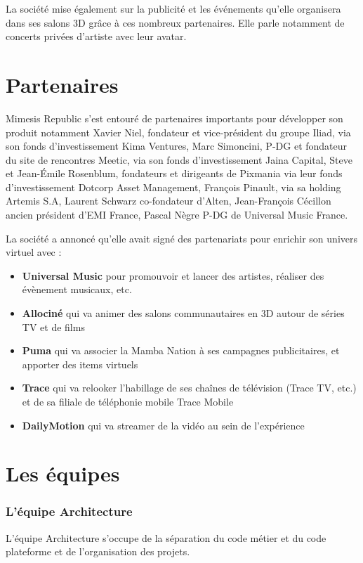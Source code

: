 La société mise également sur la publicité et les événements qu'elle organisera
dans ses salons 3D grâce à ces nombreux partenaires. Elle parle notamment de
concerts privées d'artiste avec leur avatar.

\section{Partenaires}

Mimesis Republic s'est entouré de partenaires importants pour développer son
produit notamment Xavier Niel, fondateur et vice-président du groupe Iliad, via
son fonds d’investissement Kima Ventures, Marc Simoncini, P-DG et fondateur du
site de rencontres Meetic, via son fonds d'investissement Jaina Capital, Steve
et Jean-Émile Rosenblum, fondateurs et dirigeants de Pixmania via leur fonds
d'investissement Dotcorp Asset Management, François Pinault, via sa holding
Artemis S.A, Laurent Schwarz co-fondateur d'Alten, Jean-François Cécillon ancien
président d'EMI France, Pascal Nègre P-DG de Universal Music France.

La société a annoncé qu'elle avait signé des partenariats pour enrichir son
univers virtuel avec :
\begin{itemize}
\item[\textbullet]\textbf{Universal Music} pour promouvoir et lancer des artistes,
  réaliser des évènement musicaux, etc.
\item[\textbullet]\textbf{Allociné} qui va animer des salons communautaires en
  3D autour de séries TV et de films
\item[\textbullet]\textbf{Puma} qui va associer la Mamba Nation à ses
  campagnes publicitaires, et apporter des items virtuels
\item[\textbullet]\textbf{Trace} qui va relooker l'habillage de ses chaînes de
  télévision (Trace TV, etc.) et de sa filiale de téléphonie mobile Trace
  Mobile
\item[\textbullet]\textbf{DailyMotion} qui va streamer de la vidéo au sein de
  l’expérience
\end{itemize}


\section{Les équipes}

\subsubsection{L'équipe Architecture}
L'équipe Architecture s'occupe de la séparation du code métier et du code
plateforme et de l'organisation des projets.


